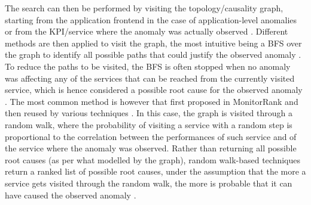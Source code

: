 The search can then be performed by visiting the topology/causality graph, starting from the application frontend in the case of application-level anomalies \cite{10_Aggarwal2020_FaultsGoldenSignals,06_Lin2018_Microscope,19_Guan2019_MicroscopeDemo,40_Chen2020_CauseInfer,48_Chen2014_CauseInfer,29_Wang2018_CloudRanger,07_Ma2019_MSRank,25_Ma2020_MSRankExtended,08_Ma2020_AutoMAP,44_Lin2018_FacGraph,21_Kim2013_RootCauseDetectionSOA,30_Thalheim2017_Sieve} or from the KPI/service where the anomaly was actually observed \cite{05_Meng2020_RootCausesMicroservices,46_Qiu2020_CausalityMiningKnowledgeGraph,13_Mariani2018_LocalizingFaultsCloudSystems,47_Liu2021_MicroHECL,04_Wu2020_MicroRCA,09_Wu2020_MicroserviceDiagnosisDeepLearning}.
Different methods are then applied to visit the graph, the most intuitive being a BFS over the graph to identify all possible paths that could justify the observed anomaly \cite{46_Qiu2020_CausalityMiningKnowledgeGraph}.
To reduce the paths to be visited, the BFS is often stopped when no anomaly was affecting any of the services that can be reached from the currently visited service, which is hence considered a possible root cause for the observed anomaly \cite{47_Liu2021_MicroHECL,40_Chen2020_CauseInfer,48_Chen2014_CauseInfer,06_Lin2018_Microscope,19_Guan2019_MicroscopeDemo}.
The most common method is however that first proposed in MonitorRank \cite{21_Kim2013_RootCauseDetectionSOA} and then reused by various techniques \cite{04_Wu2020_MicroRCA,09_Wu2020_MicroserviceDiagnosisDeepLearning,29_Wang2018_CloudRanger,07_Ma2019_MSRank,25_Ma2020_MSRankExtended,08_Ma2020_AutoMAP,05_Meng2020_RootCausesMicroservices}.
In this case, the graph is visited through a random walk, where the probability of visiting a service with a random step is proportional to the correlation between the performances of such service and of the service where the anomaly was observed. 
Rather than returning all possible root causes (as per what modelled by the graph), random walk-based techniques return a ranked list of possible root causes, under the assumption that the more a service gets visited through the random walk, the more is probable that it can have caused the observed anomaly \cite{21_Kim2013_RootCauseDetectionSOA,07_Ma2019_MSRank,25_Ma2020_MSRankExtended}.

